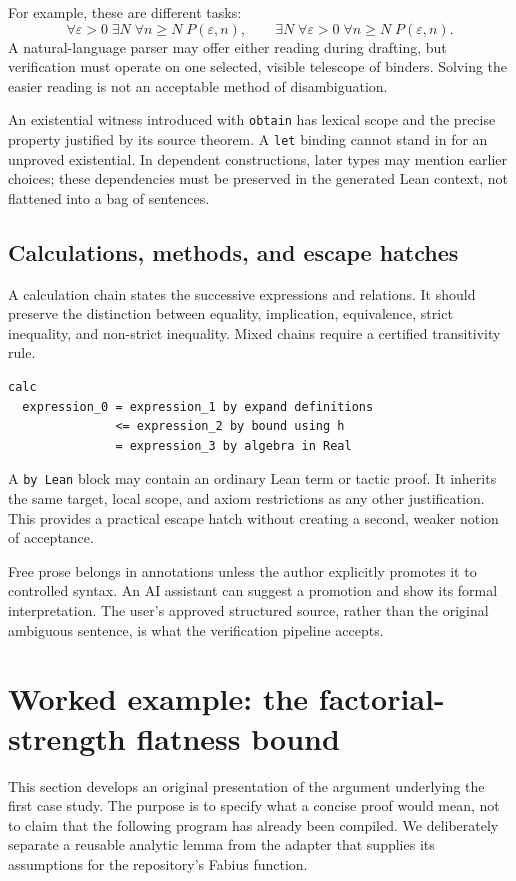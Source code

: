 \documentclass[11pt,a4paper]{article}
\newcommand{\code}[1]{\texttt{\small #1}}
\theoremstyle{definition}
\theoremstyle{remark}
\begin{document}
For example, these are different tasks:
\[
 \forall\varepsilon>0\;\exists N\;\forall n\ge N\; P(\varepsilon,n),
 \qquad
 \exists N\;\forall\varepsilon>0\;\forall n\ge N\; P(\varepsilon,n).
\]
A natural-language parser may offer either reading during drafting, but verification must operate on one selected, visible telescope of binders. Solving the easier reading is not an acceptable method of disambiguation.

An existential witness introduced with \code{obtain} has lexical scope and the precise property justified by its source theorem. A \code{let} binding cannot stand in for an unproved existential. In dependent constructions, later types may mention earlier choices; these dependencies must be preserved in the generated Lean context, not flattened into a bag of sentences.

\subsection{Calculations, methods, and escape hatches}
A calculation chain states the successive expressions and relations. It should preserve the distinction between equality, implication, equivalence, strict inequality, and non-strict inequality. Mixed chains require a certified transitivity rule.
\begin{lstlisting}
calc
  expression_0 = expression_1 by expand definitions
               <= expression_2 by bound using h
               = expression_3 by algebra in Real
\end{lstlisting}
A \code{by Lean} block may contain an ordinary Lean term or tactic proof. It inherits the same target, local scope, and axiom restrictions as any other justification. This provides a practical escape hatch without creating a second, weaker notion of acceptance.

Free prose belongs in annotations unless the author explicitly promotes it to controlled syntax. An AI assistant can suggest a promotion and show its formal interpretation. The user's approved structured source, rather than the original ambiguous sentence, is what the verification pipeline accepts.

\section{Worked example: the factorial-strength flatness bound}
\label{sec:flatness}
This section develops an original presentation of the argument underlying the first case study. The purpose is to specify what a concise proof would mean, not to claim that the following program has already been compiled. We deliberately separate a reusable analytic lemma from the adapter that supplies its assumptions for the repository's Fabius function.
\end{document}

